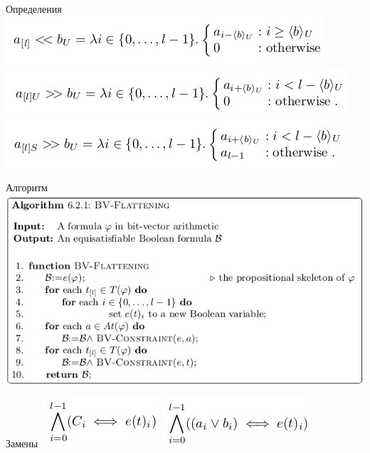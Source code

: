 \documentclass{beamer}
\begin{document}
\begin{frame}{Определения}
\includegraphics[scale=0.5]{sh0.png}\newline
\includegraphics[scale=0.5]{sh1.png}\newline
\includegraphics[scale=0.5]{sh2.png}\newline
\end{frame}

\begin{frame}{Алгоритм}
\includegraphics[scale=0.5]{algo.png}\newline
\end{frame}

\begin{frame}{Замены}
\includegraphics[scale=0.5]{skel.png}\newline
\includegraphics[scale=0.5]{or3.png}\newline
\end{frame}
\end{document}

